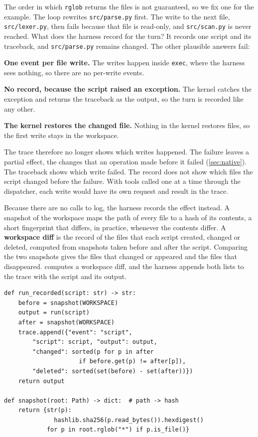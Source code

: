 The order in which \texttt{rglob} returns the files is not guaranteed, so we fix one for the
example. The loop rewrites \texttt{src/parse.py} first. The write to the next file,
\texttt{src/lexer.py}, then fails because that file is read-only, and \texttt{src/scan.py} is never
reached. What does the harness record for the turn? It records one script and its traceback, and
\texttt{src/parse.py} remains changed. The other plausible answers fail:
\bi
\item \textbf{One event per file write.} The writes happen inside \texttt{exec}, where the harness
sees nothing, so there are no per-write events.
\item \textbf{No record, because the script raised an exception.} The kernel catches the exception
and returns the traceback as the output, so the turn is recorded like any other.
\item \textbf{The kernel restores the changed file.} Nothing in the kernel restores files, so the
first write stays in the workspace.
\ei

The trace therefore no longer shows which writes happened. The failure leaves a partial effect,
the changes that an operation made before it failed (\cref{sec:native}). The traceback shows which
write failed. The record does not show which files the script changed before the failure. With
tools called one at a time through the dispatcher, each write would have its own request and
result in the trace.

Because there are no calls to log, the harness records the effect instead. A snapshot of the
workspace maps the path of every file to a hash of its contents, a short fingerprint that differs,
in practice, whenever the contents differ. A \textbf{workspace diff} is the record of the files
that each script created, changed or deleted, computed from snapshots taken before and after the
script. Comparing the two snapshots gives the files that changed or appeared and the files that
disappeared.  computes a workspace diff, and the harness appends both lists
to the trace with the script and its output.

\begin{lstlisting}[basicstyle=\ttfamily\footnotesize, columns=fixed, basewidth=0.525em, caption={Illustrative recording of a workspace diff around each script. Imports and the definitions of \texttt{WORKSPACE} and \texttt{trace} are omitted.}, label=lst:codeact-diff]
def run_recorded(script: str) -> str:
    before = snapshot(WORKSPACE)
    output = run(script)
    after = snapshot(WORKSPACE)
    trace.append({"event": "script",
        "script": script, "output": output,
        "changed": sorted(p for p in after
                     if before.get(p) != after[p]),
        "deleted": sorted(set(before) - set(after))})
    return output

def snapshot(root: Path) -> dict:  # path -> hash
    return {str(p):
              hashlib.sha256(p.read_bytes()).hexdigest()
            for p in root.rglob("*") if p.is_file()}
\end{lstlisting}

